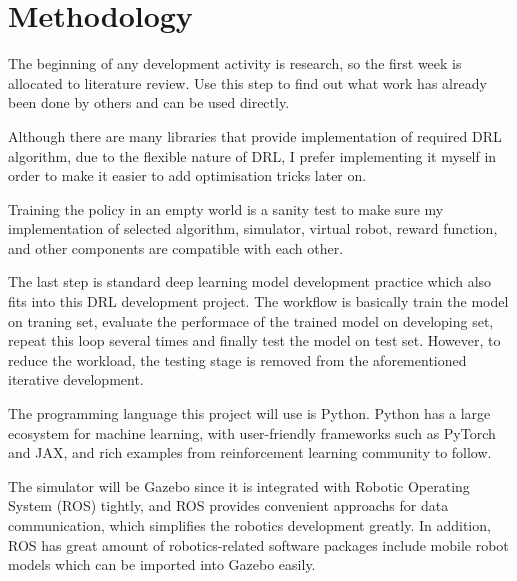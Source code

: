 \section{Methodology}

The beginning of any development activity is research, so the first week is allocated to literature review. Use this step to find out what work has already been done by others and can be used directly.

Although there are many libraries that provide implementation of required DRL algorithm, due to the flexible nature of DRL, I prefer implementing it myself in order to make it easier to add optimisation tricks later on.

Training the policy in an empty world is a sanity test to make sure my implementation of selected algorithm, simulator, virtual robot, reward function, and other components are compatible with each other.

The last step is standard deep learning model development practice which also fits into this DRL development project. The workflow is basically train the model on traning set, evaluate the performace of the trained model on developing set, repeat this loop several times and finally test the model on test set. However, to reduce the workload, the testing stage is removed from the aforementioned iterative development.

The programming language this project will use is Python. Python has a large ecosystem for machine learning, with user-friendly frameworks such as PyTorch and JAX, and rich examples from reinforcement learning community to follow.

The simulator will be Gazebo since it is integrated with Robotic Operating System (ROS) tightly, and ROS provides convenient approachs for data communication, which simplifies the robotics development greatly. In addition, ROS has great amount of robotics-related software packages include mobile robot models which can be imported into Gazebo easily.

